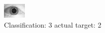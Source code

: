 \begin{figure}[h!]
\begin{center}
\includegraphics[width=0.60\columnwidth]{figures/ID1602_class_3_target_2.png}
\end{center}
\caption{ Classification: 3 actual target: 2}
\label{fig:ID1602_class_3_target_2}
\end{figure}
